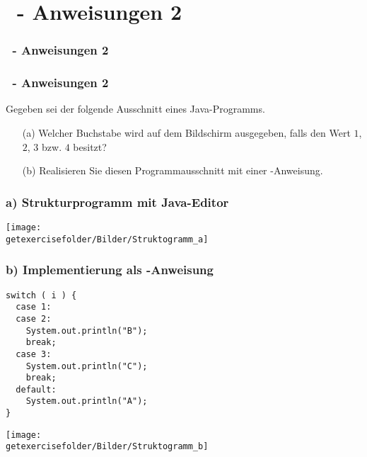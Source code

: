 \def\stitle{\theexercise\ - Anweisungen 2}
\section{\stitle}
\begin{frame}
    \frametitle{\stitle}
\tableofcontents[current]    
\end{frame}

\begin{frame}[t]%
    \frametitle{\stitle}

Gegeben sei der folgende Ausschnitt eines Java-Programms.


\begin{itemize}
\item[(a)] Welcher Buchstabe wird auf dem Bildschirm ausgegeben, falls  den Wert $1$, $2$, $3$ bzw. $4$ besitzt?
\item[(b)] Realisieren Sie diesen Programmausschnitt mit einer -Anweisung.
\end{itemize}
\end{frame}


\begin{frame}[fragile]%
 \frametitle{a) Strukturprogramm mit Java-Editor}%

\begin{center}

\texttt{[image: \\getexercisefolder/Bilder/Struktogramm\_a]}
\end{center}
\end{frame}


\begin{frame}[fragile]%
 \frametitle{b) Implementierung als -Anweisung}%

\begin{center}
\begin{minipage}{0.7\textwidth}
\begin{lstlisting}[style=JAVA]
switch ( i ) {
  case 1:
  case 2:
    System.out.println("B");
    break;
  case 3:
    System.out.println("C");
    break;
  default:
    System.out.println("A");
}
\end{lstlisting}

\end{minipage}

\texttt{[image: \\getexercisefolder/Bilder/Struktogramm\_b]}
\end{center}

\end{frame}

